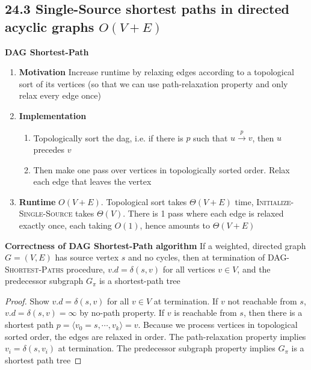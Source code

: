 \documentclass[11pt]{article}
\begin{document}
\subsection*{24.3 Single-Source shortest paths in directed acyclic graphs $O(V+E)$}


\begin{defn*}
    \textbf{DAG Shortest-Path} 
    \begin{enumerate}
        \item \textbf{Motivation} Increase runtime by relaxing edges according to a topological sort of its vertices (so that we can use path-relaxation property and only relax every edge once)
        \item \textbf{Implementation}
        \begin{enumerate}
            \item Topologically sort the dag, i.e. if there is $p$ such that $u \xrightarrow{p} v$, then $u$ precedes $v$
            \item Then make one pass over vertices in topologically sorted order. Relax each edge that leaves the vertex
        \end{enumerate}
        \item \textbf{Runtime} $O(V+E)$. Topological sort takes $\Theta(V+E)$ time, \textsc{Initialize-Single-Source} takes $\Theta(V)$. There is 1 pass where each edge is relaxed exactly once, each taking $O(1)$, hence amounts to $\Theta(V+E)$
    \end{enumerate}
\end{defn*}



\begin{theorem*}
    \textbf{Correctness of DAG Shortest-Path algorithm} If a weighted, directed graph $G = (V,E)$ has source vertex $s$ and no cycles, then at termination of \textsc{DAG-Shortest-Paths} procedure, $v.d = \delta(s,v)$ for all vertices $v\in V$, and the predecessor subgraph $G_{\pi}$ is a shortest-path tree

    \begin{proof}
        Show $v.d = \delta(s,v)$ for all $v\in V$ at termination. If $v$ not reachable from $s$, $v.d = \delta(s,v) = \infty$ by no-path property. If $v$ is reachable from $s$, then there is a shortest path $p = \langle v_0 =s,\cdots, v_k \rangle =v$. Because we process vertices in topological sorted order, the edges are relaxed in order. The path-relaxation property implies $v_i = \delta(s, v_i)$ at termination. The predecessor subgraph property implies $G_{\pi}$ is a shortest path tree
    \end{proof}
\end{theorem*}
\end{document}
